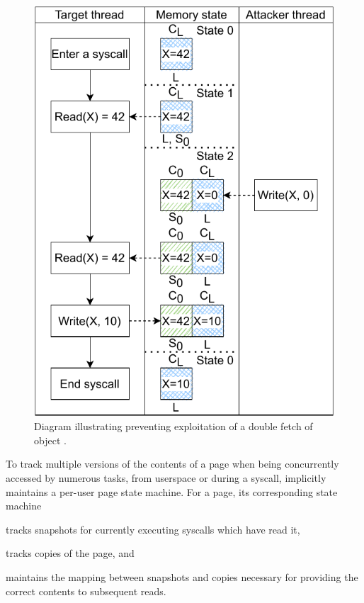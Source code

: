 \begin{figure}[h]
  \centering
  \includegraphics[width=0.6\linewidth]{media/midas/doublefetch_midas.pdf}
  \caption[Diagram illustrating \midas preventing double-fetch exploitation]
          {Diagram illustrating \midas preventing exploitation of a
           double fetch of object .}
  \label{fig:midas:doublefetch_midas}
\end{figure}

To track multiple versions of the contents of a page when being concurrently
accessed by numerous tasks, from userspace or during a syscall,
\midas implicitly maintains a per-user page state machine.
For a page, its corresponding state machine
\begin{inparaenum}
  \item tracks snapshots for currently executing syscalls which have read it,
  \item tracks copies of the page, and
  \item maintains the mapping between snapshots and copies necessary for providing
  the correct contents to subsequent reads. %
\end{inparaenum}

